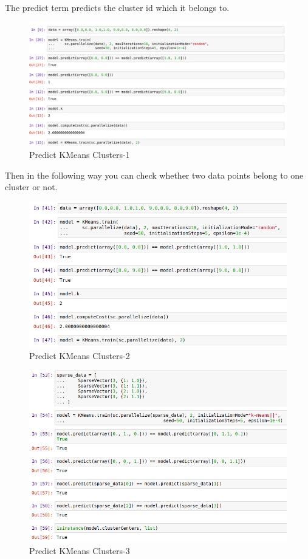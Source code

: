 The predict term predicts the cluster id which it belongs to.

\begin{figure}[htbp]
\centering
\includegraphics[width=1.0\textwidth]{images/docker-spark-tut-5.png}
\caption{Predict KMeans Clusters-1}
\end{figure}

Then in the following way you can check whether two data points belong
to one cluster or not.

\begin{figure}[htbp]
\centering
\includegraphics[width=1.0\textwidth]{images/docker-spark-tut-2.png}
\caption{Predict KMeans Clusters-2}
\end{figure}
 
\begin{figure}[htbp]
\centering
\includegraphics[width=1.0\textwidth]{images/docker-spark-tut-3.png}
\caption{Predict KMeans Clusters-3}
\end{figure}

